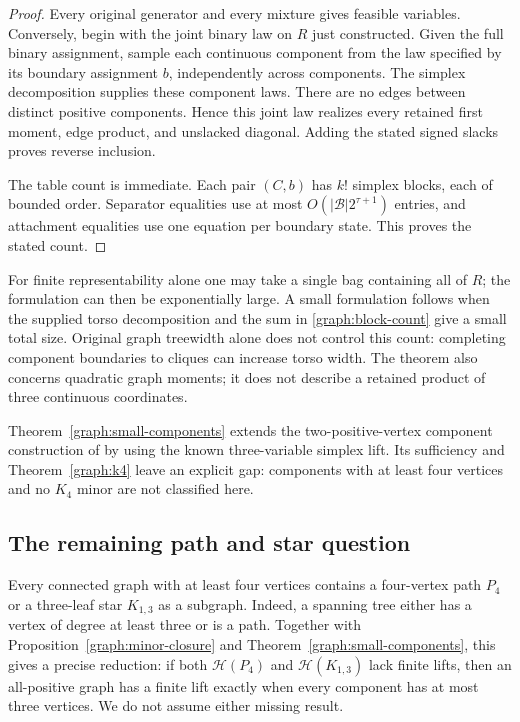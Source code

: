 \begin{proof}
Every original generator and every mixture gives feasible variables.
Conversely, begin with the joint binary law on $R$ just constructed.
Given the full binary assignment, sample each continuous component from
the law specified by its boundary assignment $b$, independently across
components. The simplex decomposition supplies these component laws.
There are no edges between distinct positive components. Hence this joint
law realizes every retained first moment, edge product, and unslacked
diagonal. Adding the stated signed slacks proves reverse inclusion.

The table count is immediate. Each pair $(C,b)$ has $k!$ simplex blocks,
each of bounded order. Separator equalities use at most
$O(|\mathcal B|2^{\tau+1})$ entries, and attachment equalities use one
equation per boundary state. This proves the stated count.
\end{proof}

For finite representability alone one may take a single bag containing
all of $R$; the formulation can then be exponentially large. A small
formulation follows when the supplied torso decomposition and the sum
in \eqref{graph:block-count} give a small total size. Original graph
treewidth alone does not control this count: completing component
boundaries to cliques can increase torso width. The theorem also concerns
quadratic graph moments; it does not describe a retained product of three
continuous coordinates.

Theorem~\ref{graph:small-components} extends the two-positive-vertex
component construction of \citet{Khajavirad2026SparseBoxQP} by using the known
three-variable simplex lift. Its sufficiency and
Theorem~\ref{graph:k4} leave an explicit gap: components with at least four
vertices and no $K_4$ minor are not classified here.

\subsection{The remaining path and star question}

Every connected graph with at least four vertices contains a four-vertex
path $P_4$ or a three-leaf star $K_{1,3}$ as a subgraph. Indeed, a spanning
tree either has a vertex of degree at least three or is a path. Together
with Proposition~\ref{graph:minor-closure} and
Theorem~\ref{graph:small-components}, this gives a precise reduction: if
both $\mathcal H(P_4)$ and $\mathcal H(K_{1,3})$ lack finite lifts, then an
all-positive graph has a finite lift exactly when every component has at
most three vertices. We do not assume either missing result.

